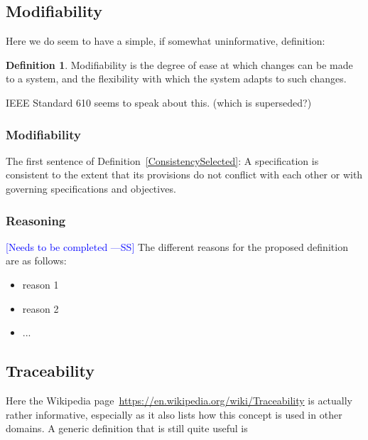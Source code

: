 \documentclass[letterpaper, cleveref]{lipics-v2019}
\newcommand{\authornote}[3]{\textcolor{#1}{[#3 ---#2]}}
\newcommand{\authornote}[3]{}
\newcommand{\wss}[1]{\authornote{blue}{SS}{#1}} %
\newcommand{\jc}[1]{\authornote{red}{JC}{#1}} %
\newcommand{\notdone}[1]{\textcolor{red}{#1}}
\theoremstyle{definition}
\newtheorem{defn}{Definition}
\begin{document}

\subsection{Modifiability} %

Here we do seem to have a simple, if somewhat uninformative, definition:

\begin{defn}
  Modifiability is the degree of ease at which changes can be made to a
  system, and the flexibility with which the system adapts to such changes.
\end{defn}

IEEE Standard 610 seems to speak about this. (which is superseded?)

\begin{mybox}
\subsubsection*{Modifiability} 
The first sentence of Definition~\ref{ConsistencySelected}: A specification is
consistent to the extent that its provisions do not conflict with each other or
with governing specifications and objectives.
\end{mybox}

\subsubsection*{Reasoning}

\wss{Needs to be completed}   The
different reasons for the proposed definition are as follows:

\begin{itemize}
  \item reason 1
  \item reason 2
  \item ...
\end{itemize}


\subsection{Traceability} %

Here the Wikipedia page~\url{https://en.wikipedia.org/wiki/Traceability} is
actually rather informative, especially as it also lists how this concept is
used in other domains.  A generic definition that is still quite useful is
\end{document}
